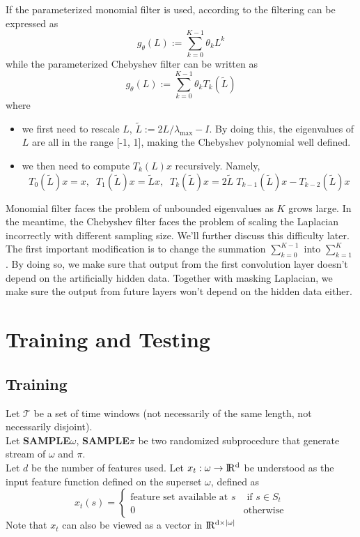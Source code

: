 \documentclass[12pt]{article}
\newcommand{\R}{\ensuremath{
    \rm I\!R}
}
\begin{document}
If the parameterized monomial filter is used, according to \cite{defferrard2016convolutional} the filtering can be expressed as
\[g_{\theta}(L) := \sum_{k=0}^{K-1} \theta_k L^k\]
while the parameterized Chebyshev filter can be written as
\[g_{\theta}(L) := \sum_{k=0}^{K-1} \theta_k T_k(\tilde{L})\]
where 
\begin{itemize}
    \item we first need to rescale $L$, $\tilde{L} := 2L/\lambda_{\max} - I$. By doing this, the eigenvalues of $L$ are all in the range [-1, 1], making the Chebyshev polynomial well defined. 
    \item we then need to compute $T_k(L)x$ recursively. Namely,
\[T_0(\tilde{L})x = x,\;\; T_1(\tilde{L})x = \tilde{L}x,\;\; T_k(\tilde{L})x = 2\tilde{L}\;T_{k-1}(\tilde{L})x - T_{k-2}(\tilde{L})x\]
\end{itemize}

Monomial filter faces the problem of unbounded eigenvalues as $K$ grows large. In the meantime, the Chebyshev filter faces the problem of scaling the Laplacian incorrectly with different sampling size. We'll further discuss this difficulty later. \\

The first important modification is to change the summation $\sum_{k=0}^{K-1}$ into $\sum_{k=1}^K$. By doing so, we make sure that output from the first convolution layer doesn't depend on the artificially hidden data. Together with masking Laplacian, we make sure the output from future layers won't depend on the hidden data either. 
\newpage

\section{Training and Testing}
\subsection{Training}
Let $\mathcal{T}$ be a set of time windows (not necessarily of the same length, not necessarily disjoint).\\
Let \textbf{SAMPLE}$\omega$, \textbf{SAMPLE}$\pi$ be two randomized subprocedure that generate stream of $\omega$ and $\pi$. \\
Let $d$ be the number of features used. Let $x_t: \omega \to \R^d$ be understood as the input feature function defined on the superset $\omega$, defined as
\[x_t(s) = \begin{cases}
    \text{feature set available at } s &\text{ if } s\in S_t\\
    0 &\text{otherwise}
\end{cases}\]
Note that $x_t$ can also be viewed as a vector in $\R^{d\times|\omega|}$
\end{document}
